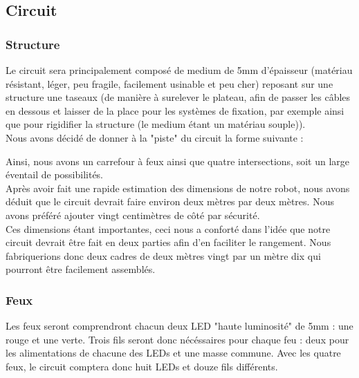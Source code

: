 \subsection{Circuit}

	\subsubsection{Structure}

		Le circuit sera principalement composé de medium de 5mm d'épaisseur (matériau résistant, léger, peu fragile, facilement usinable et peu cher) reposant sur une structure une taseaux (de manière à surelever le plateau, afin de passer les câbles en dessous et laisser de la place pour les systèmes de fixation, par exemple ainsi que pour rigidifier la structure (le medium étant un matériau souple)).\\

		Nous avons décidé de donner à la "piste" du circuit la forme suivante :


		Ainsi, nous avons un carrefour à feux ainsi que quatre intersections, soit un large éventail de possibilités.\\

		Après avoir fait une rapide estimation des dimensions de notre robot, nous avons déduit que le circuit devrait faire environ deux mètres par deux mètres.
		Nous avons préféré ajouter vingt centimètres de côté par sécurité.\\

		Ces dimensions étant importantes, ceci nous a conforté dans l'idée que notre circuit devrait être fait en deux parties afin d'en faciliter le rangement. Nous fabriquerions donc deux cadres de deux mètres vingt par un mètre dix qui pourront être facilement assemblés.

	\subsubsection{Feux}

		Les feux seront comprendront chacun deux LED "haute luminosité" de 5mm : une rouge et une verte. Trois fils seront donc nécéssaires pour chaque feu : deux pour les alimentations de chacune des LEDs et une masse commune. Avec les quatre feux, le circuit comptera donc huit LEDs et douze fils différents.\\

